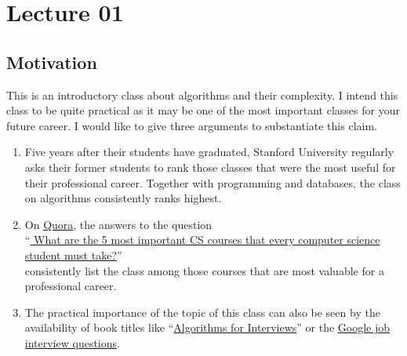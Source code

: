 \chapter{Lecture 01}

\section{Motivation}

This is an introductory class about algorithms and their complexity.
I intend this class to be quite practical as it may be one of the most important classes for your future
career.  I would like to give three arguments to substantiate this claim.

\begin{enumerate}
\item Five years after their students have graduated, Stanford University 
      regularly asks their former students to rank those classes that were the most useful for their professional
      career.  Together with programming and databases, the class on algorithms consistently ranks highest.
\item On \href{https://quora.com}{Quora}, the answers to the question
      \\[0.1cm]
      \hspace*{0.0cm}
      ``\href{https://www.quora.com/What-are-the-5-most-important-CS-courses-that-every-computer-science-student-must-take}{
        What are the 5 most important CS courses that every computer science student must take?}''
      \\[0.1cm]
      consistently list the class  among those courses that are most valuable
      for a professional career.  
\item The practical importance of the topic of this class can also be seen by the
      availability of book titles like
      ``\href{https://www.amazon.com/Algorithms-Interviews-Adnan-Aziz/dp/1453792996}{Algorithms for Interviews}''  
      \cite{cormen:01} or the \href{http://www.youtube.com/watch?v=k4RRi_ntQc8}{Google job interview questions}.
\end{enumerate} 
